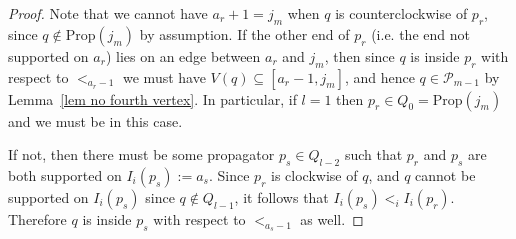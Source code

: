 \documentclass[11pt]{article}
\newcommand{\cP}{\mathcal{P}}
\newcommand{\Prop}{\textrm{Prop}}
\theoremstyle{remark}
\theoremstyle{definition}
\begin{document}
\begin{proof}
Note that we cannot have $a_r+ 1 = j_m$ when $q$ is counterclockwise of $p_r$, since $q \not\in \Prop(j_m)$ by assumption. If the other end of $p_r$ (i.e. the end not supported on $a_r$) lies on an edge between $a_r$ and $j_m$, then since $q$ is inside $p_r$ with respect to $<_{a_r-1}$ we must have $V(q) \subseteq [a_r-1,j_m]$, and hence $q \in \cP_{m-1}$ by Lemma~\ref{lem no fourth vertex}. In particular, if $l=1$ then $p_r \in Q_{0} = \Prop(j_m)$ and we must be in this case. 

If not, then there must be some propagator $p_s \in Q_{l-2}$ such that $p_r$ and $p_s$ are both supported on $I_i(p_s) := a_s$. Since $p_r$ is clockwise of $q$, and $q$ cannot be supported on $I_i(p_s)$ since $q \not\in Q_{l-1}$, it follows that $I_i(p_s) <_i I_i(p_r)$. Therefore $q$ is inside $p_s$ with respect to $<_{a_s - 1}$ as well.


\end{proof}
\end{document}
